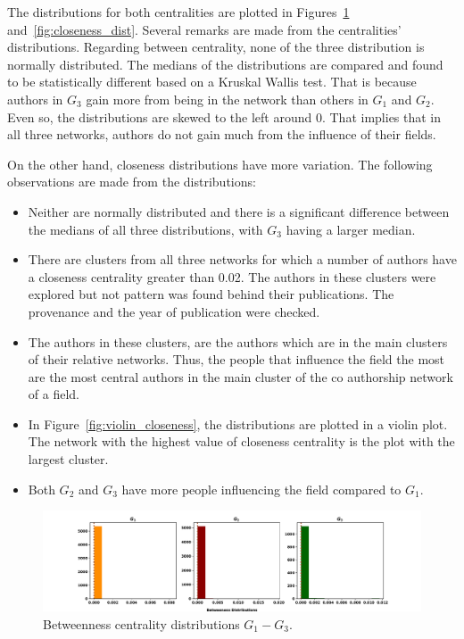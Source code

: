 \documentclass{article}
\theoremstyle{definition}
\begin{document}
The distributions for both centralities are plotted in Figures~\ref{fig:betweenness_dist}
and~\ref{fig:closeness_dist}. Several remarks are made from the centralities'
distributions. Regarding between centrality, none of the three distribution is
normally distributed. The medians of the distributions are compared and found to be
statistically different based on a Kruskal Wallis test. That is because authors
in \(G_3\) gain more from being in the network than others in \(G_1\) and \(G_2\).
Even so, the distributions are skewed to the left around 0. That implies that
in all three networks, authors do not gain much from the influence of their
fields.

On the other hand, closeness distributions have more variation. The following
observations are made from the distributions:

\begin{itemize}
    \item  Neither are normally distributed and there is a significant difference
    between the medians of all three distributions, with \(G_3\) having a larger median.
    \item There are clusters from all three networks for which a number of authors
    have a closeness centrality greater than 0.02. The authors in these clusters
    were explored but not pattern was found behind their publications. The
    provenance and the year of publication were checked.
    \item The authors in these clusters, are the authors which are in the main
    clusters of their relative networks. Thus, the people that influence the
    field the most are the most central authors in the main cluster of the
    co authorship network of a field.
    \item In Figure~\ref{fig:violin_closeness}, the distributions are plotted in
    a violin plot. The network with the highest value of closeness centrality
    is the plot with the largest cluster.
    \item Both \(G_2\) and \(G_3\) have more people influencing the field compared
    to \(G_1\).
\end{itemize}

\begin{figure}[!hbtp]
    \centering
    \includegraphics[width=\textwidth]{./assets/images/betweeness_distributions.pdf}
    \caption{Betweenness centrality distributions \(G_1-G_3\).}\label{fig:betweenness_dist}
\end{figure}
\end{document}
